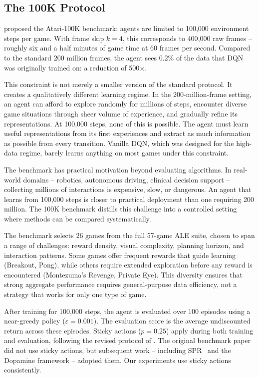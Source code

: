 \subsection{The 100K Protocol}
\label{subsec:100k-protocol}

\citet{kaiser2020model} proposed the Atari-100K benchmark: agents
are limited to 100{,}000 environment steps per game. With frame
skip $k = 4$, this corresponds to 400{,}000 raw frames -- roughly
six and a half minutes of game time at 60 frames per second.
Compared to the standard 200 million frames, the agent sees 0.2\%
of the data that DQN was originally trained on: a reduction of
500$\times$.

\smallskip
This constraint is not merely a smaller version of the standard
protocol. It creates a qualitatively different learning regime. In
the 200-million-frame setting, an agent can afford to explore
randomly for millions of steps, encounter diverse game situations
through sheer volume of experience, and gradually refine its
representations. At 100{,}000 steps, none of this is possible. The
agent must learn useful representations from its first experiences
and extract as much information as possible from every transition.
Vanilla DQN, which was designed for the high-data regime, barely
learns anything on most games under this constraint.

\smallskip
The benchmark has practical motivation beyond evaluating
algorithms. In real-world domains -- robotics, autonomous driving,
clinical decision support -- collecting millions of interactions is
expensive, slow, or dangerous. An agent that learns from 100{,}000
steps is closer to practical deployment than one requiring 200
million. The 100K benchmark distills this challenge into a
controlled setting where methods can be compared systematically.

\smallskip
The benchmark selects 26 games from the full 57-game ALE suite,
chosen to span a range of challenges: reward density, visual
complexity, planning horizon, and interaction patterns. Some games
offer frequent rewards that guide learning (Breakout, Pong), while
others require extended exploration before any reward is
encountered (Montezuma's Revenge, Private Eye). This diversity
ensures that strong aggregate performance requires general-purpose
data efficiency, not a strategy that works for only one type of
game.

\smallskip
After training for 100{,}000 steps, the agent is evaluated over
100 episodes using a near-greedy policy ($\varepsilon = 0.001$).
The evaluation score is the average undiscounted return across
these episodes. Sticky actions ($p = 0.25$) apply during both
training and evaluation, following the revised protocol of
\citet{machado2018revisiting}. The original benchmark paper
\citep{kaiser2020model} did not use sticky actions, but subsequent
work -- including SPR~\citep{schwarzer2021dataefficient} and the
Dopamine framework -- adopted them. Our experiments use sticky
actions consistently.

